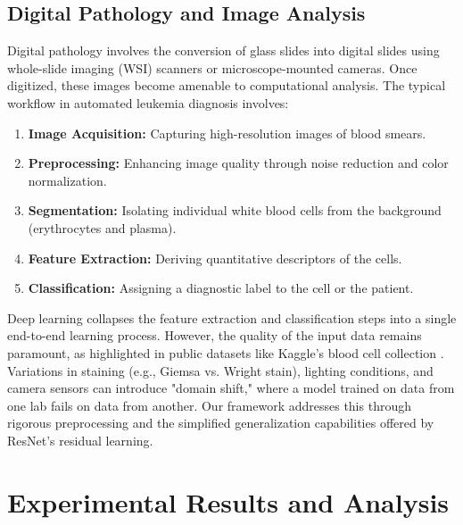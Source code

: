 \documentclass[12pt, a4paper]{article}
\begin{document}
\subsection{Digital Pathology and Image Analysis}
Digital pathology involves the conversion of glass slides into digital slides using whole-slide imaging (WSI) scanners or microscope-mounted cameras. Once digitized, these images become amenable to computational analysis. The typical workflow in automated leukemia diagnosis involves:
\begin{enumerate}
    \item \textbf{Image Acquisition:} Capturing high-resolution images of blood smears.
    \item \textbf{Preprocessing:} Enhancing image quality through noise reduction and color normalization.
    \item \textbf{Segmentation:} Isolating individual white blood cells from the background (erythrocytes and plasma).
    \item \textbf{Feature Extraction:} Deriving quantitative descriptors of the cells.
    \item \textbf{Classification:} Assigning a diagnostic label to the cell or the patient.
\end{enumerate}

Deep learning collapses the feature extraction and classification steps into a single end-to-end learning process. However, the quality of the input data remains paramount, as highlighted in public datasets like Kaggle's blood cell collection \cite{r9}. Variations in staining (e.g., Giemsa vs. Wright stain), lighting conditions, and camera sensors can introduce "domain shift," where a model trained on data from one lab fails on data from another. Our framework addresses this through rigorous preprocessing and the simplified generalization capabilities offered by ResNet's residual learning.

\section{Experimental Results and Analysis}
\end{document}
